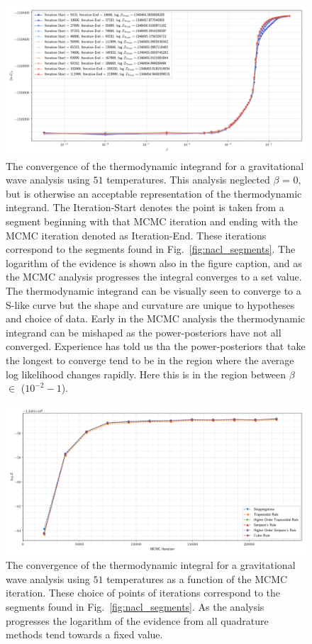 \begin{figure}[th]
\centering
\includegraphics[width=1.0\columnwidth]{figs/chapter6/lsc_sim_integrand_progress.png}
\caption{The convergence of the thermodynamic integrand for a gravitational wave analysis using $51$ temperatures. This analysis neglected $\beta$ = $0$, but is otherwise an acceptable representation of the thermodynamic integrand. The Iteration-Start denotes the point is taken from a segment beginning with that MCMC iteration and ending with the MCMC iteration denoted as Iteration-End. These iterations correspond to the segments found in Fig.~\ref{fig:nacl_segments}. The logarithm of the evidence is shown also in the figure caption, and as the MCMC analysis progresses the integral converges to a set value. The thermodynamic integrand can be visually seen to converge to a S-like curve but the shape and curvature are unique to hypotheses and choice of data. Early in the MCMC analysis the thermodynamic integrand can be mishaped as the power-posteriors have not all converged. Experience has told us tha the power-posteriors that take the longest to converge tend to be in the region where the average log likelihood changes rapidly. Here this is in the region between $\beta$ $\in$ ($10^{-2} - 1$).}
\label{fig:integrand_convergence}
\end{figure}

\begin{figure}[th]
\centering
\includegraphics[width=1.0\columnwidth]{figs/chapter6/lvc_sim_evidence_convergence.png}
\caption{The convergence of the thermodynamic integral for a gravitational wave analysis using $51$ temperatures as a function of the MCMC iteration. These choice of points of iterations correspond to the segments found in Fig.~\ref{fig:nacl_segments}. As the analysis progresses the logarithm of the evidence from all quadrature methods tend towards a fixed value.}
\label{fig:integral_convergence}
\end{figure}


